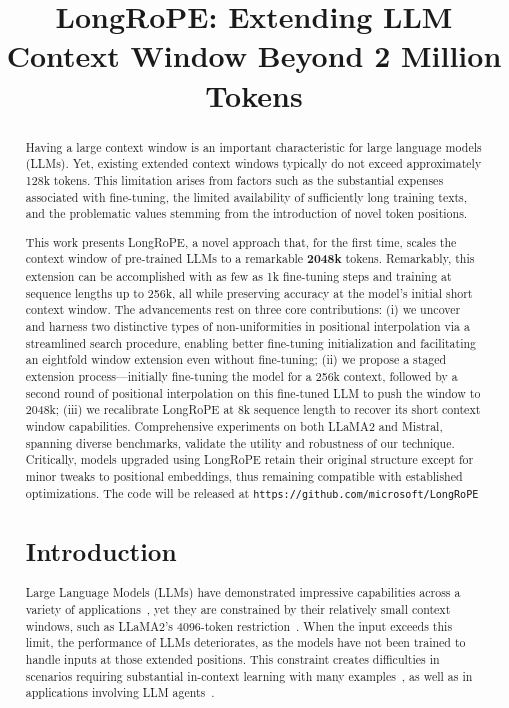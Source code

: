 \title{LongRoPE: Extending LLM Context Window Beyond 2 Million Tokens}

\begin{abstract}
Having a large context window is an important characteristic for large language models (LLMs). Yet, existing extended context windows typically do not exceed approximately 128k tokens. This limitation arises from factors such as the substantial expenses associated with fine-tuning, the limited availability of sufficiently long training texts, and the problematic values stemming from the introduction of novel token positions.

This work presents LongRoPE, a novel approach that, for the first time, scales the context window of pre-trained LLMs to a remarkable \textbf{2048k} tokens. Remarkably, this extension can be accomplished with as few as 1k fine-tuning steps and training at sequence lengths up to 256k, all while preserving accuracy at the model’s initial short context window. The advancements rest on three core contributions: (i) we uncover and harness two distinctive types of non-uniformities in positional interpolation via a streamlined search procedure, enabling better fine-tuning initialization and facilitating an eightfold window extension even without fine-tuning; (ii) we propose a staged extension process—initially fine-tuning the model for a 256k context, followed by a second round of positional interpolation on this fine-tuned LLM to push the window to 2048k; (iii) we recalibrate LongRoPE at 8k sequence length to recover its short context window capabilities. Comprehensive experiments on both LLaMA2 and Mistral, spanning diverse benchmarks, validate the utility and robustness of our technique. Critically, models upgraded using LongRoPE retain their original structure except for minor tweaks to positional embeddings, thus remaining compatible with established optimizations. The code will be released at \texttt{https://github.com/microsoft/LongRoPE}

\section{Introduction}

Large Language Models (LLMs) have demonstrated impressive capabilities across a variety of applications~\cite{gpt4,llama2}, yet they are constrained by their relatively small context windows, such as LLaMA2's 4096-token restriction~\cite{llama2}. When the input exceeds this limit, the performance of LLMs deteriorates, as the models have not been trained to handle inputs at those extended positions. This constraint creates difficulties in scenarios requiring substantial in-context learning with many examples~\cite{Huang2023FewerIM}, as well as in applications involving LLM agents~\cite{park2023generative,madaan2023selfrefine}.


\end{abstract}
